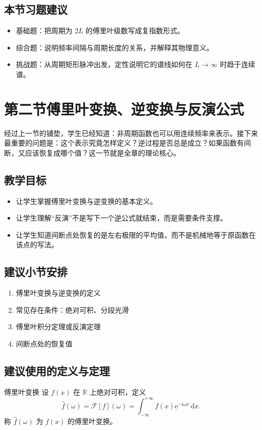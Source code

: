 \subsection*{本节习题建议}
\begin{itemize}
    \item 基础题：把周期为 $2L$ 的傅里叶级数写成复指数形式。
    \item 综合题：说明频率间隔与周期长度的关系，并解释其物理意义。
    \item 挑战题：从周期矩形脉冲出发，定性说明它的谱线如何在 $L\to\infty$ 时趋于连续谱。
\end{itemize}

\section{第二节\quad 傅里叶变换、逆变换与反演公式}

\begin{wulibj}[本节要解决的问题]
经过上一节的铺垫，学生已经知道：非周期函数也可以用连续频率来表示。接下来最重要的问题是：这个表示究竟怎样定义？逆过程是否总是成立？如果函数有间断，又应该恢复成哪个值？这一节就是全章的理论核心。
\end{wulibj}

\subsection*{教学目标}
\begin{itemize}
    \item 让学生掌握傅里叶变换与逆变换的基本定义。
    \item 让学生理解``反演''不是写下一个逆公式就结束，而是需要条件支撑。
    \item 让学生知道间断点处恢复的是左右极限的平均值，而不是机械地等于原函数在该点的写法。
\end{itemize}

\subsection*{建议小节安排}
\begin{enumerate}
    \item 傅里叶变换与逆变换的定义
    \item 常见存在条件：绝对可积、分段光滑
    \item 傅里叶积分定理或反演定理
    \item 间断点处的恢复值
\end{enumerate}

\subsection*{建议使用的定义与定理}
\begin{dingliyi}{傅里叶变换}{}
设 $f(x)$ 在 $\mathbb{R}$ 上绝对可积，定义
\[
    \hat{f}(\omega)=\mathcal{F}[f](\omega)=\int_{-\infty}^{+\infty} f(x)\mathrm{e}^{-\mathrm{i}\omega x}\,\mathrm{d}x.
\]
称 $\hat{f}(\omega)$ 为 $f(x)$ 的傅里叶变换。
\end{dingliyi}

